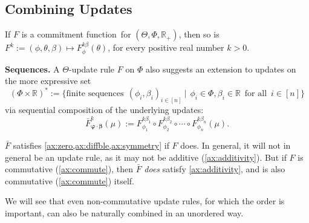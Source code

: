 \documentclass{article}
\def\cofunc{commitment function}
\def\Rplus{\mathbb R_+}
\begin{document}
\subsection{Combining Updates}
\begin{prop}
	If $F$ is a \cofunc\ for $(\Theta,\Phi,\Rplus)$, then so is
	$F^k := (\phi,\theta,\beta) \mapsto F^{k\beta}_\phi(\theta)$,
	for every positive real number $k > 0$.
		\label{prop:rescale}
\end{prop}


\textbf{Sequences.}
A $\Theta$-update rule $F$ on $\Phi$ also suggests an extension to updates on the more expressive set
\[
(\Phi \times \mathbb R)^* := \Big\{
	\text{finite sequences}~
	~ (\phi_i, \beta_i)_{i \in [n]}
	~\Big|~
	~ \phi_i \in \Phi, \beta_i \in \mathbb R \,\text{ for all }\, i \in
		[n]
	\Big\}
\]
via sequential composition of the underlying updates:
\[
	\bar F^{k}_{\boldsymbol \varphi \cdot \boldsymbol\beta}
		(\mu) := F^{k \beta_1}_{\phi_1} \circ F^{k \beta_2}_{\phi_2}
			\circ \cdots\circ F^{k \beta_n}_{\phi_n}(\mu).
\]

$\bar F$ satisfies \cref{ax:zero,ax:diffble,ax:symmetry} if $F$ does.
In general, it will not in general be an update rule, as it may not be additive (\cref{ax:additivity}). But if $F$ is commutative (\cref{ax:commute}), then $\bar F$ \emph{does} satisfy \cref{ax:additivity}, and is also commutative (\cref{ax:commute}) itself.


We will see that even non-commutative update rules, for which the order is important, can also be naturally combined in an unordered way.
\end{document}
